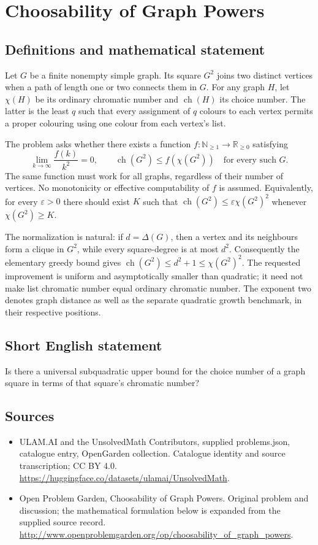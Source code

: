 \documentclass[11pt,a4paper]{article}
\begin{document}
\section*{Choosability of Graph Powers}\label{statement}

\subsection{Definitions and mathematical statement}
Let $G$ be a finite nonempty simple graph. Its square $G^2$ joins two
distinct vertices when a path of length one or two connects them in $G$.
For any graph $H$, let $\chi(H)$ be its ordinary chromatic number and
$\operatorname{ch}(H)$ its choice number. The latter is the least $q$
such that every assignment of $q$ colours to each vertex permits a proper
colouring using one colour from each vertex's list.

The problem asks whether there exists a function
$f:\mathbb N_{\ge1}\to\mathbb R_{\ge0}$ satisfying
\[
 \lim_{k\to\infty}\frac{f(k)}{k^2}=0,
 \qquad
 \operatorname{ch}(G^2)\le f(\chi(G^2))
 \quad\text{for every such }G.
\]
The same function must work for all graphs, regardless of their number
of vertices. No monotonicity or effective computability of $f$ is assumed.
Equivalently, for every $\varepsilon>0$ there should exist $K$ such that
$\operatorname{ch}(G^2)\le\varepsilon\chi(G^2)^2$ whenever
$\chi(G^2)\ge K$.

The normalization is natural: if $d=\Delta(G)$, then a vertex and its
neighbours form a clique in $G^2$, while every square-degree is at most
$d^2$. Consequently the elementary greedy bound gives
$\operatorname{ch}(G^2)\le d^2+1\le\chi(G^2)^2$.
The requested improvement is uniform and asymptotically smaller than
quadratic; it need not make list chromatic number equal ordinary
chromatic number. The exponent two denotes graph distance as well as
the separate quadratic growth benchmark, in their respective positions.
\subsection{Short English statement}
Is there a universal subquadratic upper bound for the choice number of a graph square in terms of that square’s chromatic number?
\subsection{Sources}
\begin{itemize}
\item[S1] ULAM.AI and the UnsolvedMath Contributors, supplied problems.json, catalogue entry, OpenGarden collection. Catalogue identity and source transcription; CC BY 4.0.
\url{https://huggingface.co/datasets/ulamai/UnsolvedMath}.
\item[S2] Open Problem Garden, Choosability of Graph Powers. Original problem and discussion; the mathematical formulation below is expanded from the supplied source record.
\url{http://www.openproblemgarden.org/op/choosability_of_graph_powers}.
\end{itemize}
\end{document}
